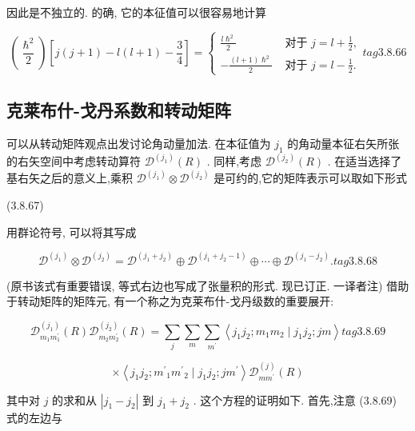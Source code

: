 因此是不独立的. 的确, 它的本征值可以很容易地计算

$$
\left( \frac{{\hslash }^{2}}{2}\right) \left\lbrack {j\left( {j + 1}\right) - l\left( {l + 1}\right) - \frac{3}{4}}\right\rbrack = \left\{ \begin{array}{ll} \frac{l{\hslash }^{2}}{2} & \text{ 对于 }j = l + \frac{1}{2}, \\ - \frac{\left( {l + 1}\right) {\hslash }^{2}}{2} & \text{ 对于 }j = l - \frac{1}{2}. \end{array}\right. tag{3.8.66}
$$

\subsection{克莱布什-戈丹系数和转动矩阵}

可以从转动矩阵观点出发讨论角动量加法. 在本征值为 ${j}_{1}$ 的角动量本征右矢所张的右矢空间中考虑转动算符 ${\mathcal{D}}^{\left( {j}_{1}\right) }\left( R\right)$ . 同样,考虑 ${\mathcal{D}}^{\left( {j}_{2}\right) }\left( R\right)$ . 在适当选择了基右矢之后的意义上,乘积 ${\mathcal{D}}^{\left( {j}_{1}\right) } \otimes {\mathcal{D}}^{\left( {j}_{2}\right) }$ 是可约的,它的矩阵表示可以取如下形式

(3.8.67)

用群论符号, 可以将其写成

$$
{\mathcal{D}}^{\left( {j}_{1}\right) } \otimes {\mathcal{D}}^{\left( {j}_{2}\right) } = {\mathcal{D}}^{\left( {j}_{1} + {j}_{2}\right) } \oplus {\mathcal{D}}^{\left( {j}_{1} + {j}_{2} - 1\right) } \oplus \cdots \oplus {\mathcal{D}}^{\left( {j}_{1} - {j}_{2}\right) }. tag{3. 8.68}
$$

(原书该式有重要错误, 等式右边也写成了张量积的形式. 现已订正. 一译者注) 借助于转动矩阵的矩阵元, 有一个称之为克莱布什-戈丹级数的重要展开:

$$
{\mathcal{D}}_{{m}_{1}{m}_{1}^{\prime }}^{\left( {j}_{1}\right) }\left( R\right) {\mathcal{D}}_{{m}_{2}{m}_{2}^{\prime }}^{\left( {j}_{2}\right) }\left( R\right) = \mathop{\sum }\limits_{j}\mathop{\sum }\limits_{m}\mathop{\sum }\limits_{{m}^{\prime }}\left\langle {{j}_{1}{j}_{2};{m}_{1}{m}_{2} \mid {j}_{1}{j}_{2};{jm}}\right\rangle tag{3.8.69}
$$

$$
\times \left\langle {{j}_{1}{j}_{2};{m}^{\prime }{}_{1}{m}^{\prime }{}_{2} \mid {j}_{1}{j}_{2};j{m}^{\prime }}\right\rangle {\mathcal{D}}_{m{m}^{\prime }}^{\left( j\right) }\left( R\right)
$$

其中对 $j$ 的求和从 $\left| {{j}_{1} - {j}_{2}}\right|$ 到 ${j}_{1} + {j}_{2}$ . 这个方程的证明如下. 首先,注意 (3.8.69) 式的左边与

